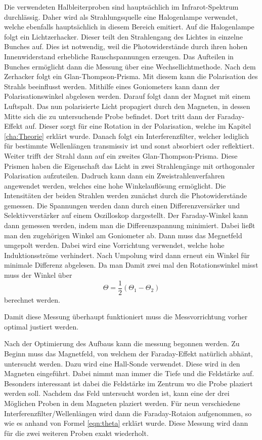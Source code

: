 Die verwendeten Halbleiterproben  sind hauptsächlich im Infrarot-Spektrum durchlässig. Daher wird als Strahlungsquelle eine Halogenlampe verwendet, welche ebenfalls 
hauptsächlich in diesem Bereich emitiert. Auf die Halogenlampe folgt ein Lichtzerhacker. Dieser teilt den Strahlengang des Lichtes in einzelne Bunches auf. Dies ist notwendig,
weil die Photowiderstände durch ihren hohen Innenwiderstand erhebliche Rauschspannungen erzeugen. Das Aufteilen in Bunches ermöglicht dann die Messung über eine Wechsellichtmethode.
Nach dem Zerhacker folgt ein Glan-Thompson-Prisma. Mit diesem kann die Polarisation des Strahls beeinflusst werden. Mithilfe eines Goniometers kann dann der Polarisationswinkel abgelesen 
werden. Darauf folgt dann der Magnet mit einem Luftspalt. Das nun polarisierte Licht propagiert durch den Magneten, in dessen Mitte sich die zu untersuchende Probe befindet. Dort 
tritt dann der Faraday-Effekt auf. Dieser sorgt für eine Rotation in der Polarisation, welche im Kapitel \ref{cha:Theorie} erklärt wurde. Danach folgt ein Interferenzfilter, welcher 
lediglich für bestimmte Wellenlängen transmissiv ist und sonst absorbiert oder reflektiert. Weiter trifft der Strahl dann auf ein zweites Glan-Thompson-Prisma. Diese Prismen haben 
die Eigenschaft das Licht in zwei Strahlengänge mit orthogonaler Polarisation aufzuteilen. Dadruch kann dann ein Zweistrahlenverfahren angewendet werden, welches eine hohe Winkelauflösung 
ermöglicht. Die Intensitäten der beiden Strahlen werden zunächst durch die Photowiderstände gemessen. Die Spannungen werden dann durch einen Differenzversärker und Selektivverstärker 
auf einem Oszilloskop dargestellt. Der Faraday-Winkel kann dann gemessen werden, indem man die Differenzspannung minimiert. Dabei ließt man den zugehörigen Winkel am Goniometer ab. 
Dann muss das Megnetfeld umgepolt werden. Dabei wird eine Vorrichtung verwendet, welche hohe Induktionsströme verhindert. Nach Umpolung wird dann erneut ein Winkel für minimale 
Differenz abgelesen. Da man Damit zwei mal den Rotationswinkel misst muss der Winkel über 
\begin{equation}
              \label{eqn:theta}
              \Theta = \frac{1}{2}\left(\Theta_1 - \Theta_2\right)
\end{equation}
berechnet werden.

Damit diese Messung überhaupt funktioniert muss die Messvorrichtung vorher optimal justiert werden. 

Nach der Optimierung des Aufbaus kann die messung begonnen werden. Zu Beginn muss das Magnetfeld, von welchem der Faraday-Effekt natürlich abhänt, untersucht werden. Dazu wird eine 
Hall-Sonde verwendet. Diese wird in den Magneten eingeführt. Dabei nimmt man immer die Tiefe und die Feldstärke auf. Besonders interessant ist dabei die Feldstärke im Zentrum
wo die Probe plaziert werden soll. Nachdem das Feld untersucht worden ist, kann eine der drei Möglichen  Proben in dem Magneten plaziert werden. Für neun verschiedene 
Interferenzfilter/Wellenlängen wird dann die Faraday-Rotaion aufgenommen, so wie es anhand von Formel \eqref{eqn:theta} erklärt wurde. Diese Messung wird dann für die zwei weiteren 
Proben exakt wiederholt.   